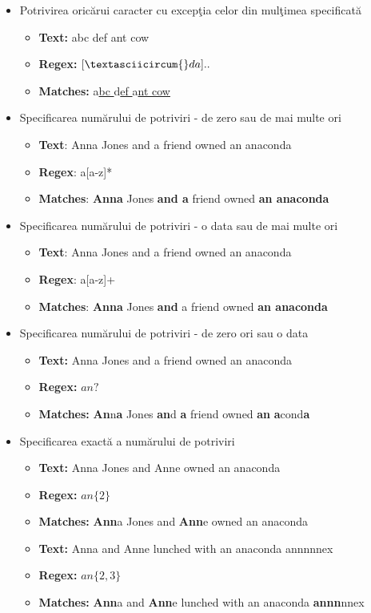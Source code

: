 \begin{itemize}
\item {Potrivirea oricărui caracter cu excepţia celor din mulţimea specificată}
	\begin{itemize}
	\item \textbf{Text:} \space abc def ant cow
	\item \textbf{Regex:} \space $[\textasciicircum{} da]..$
	\item \textbf{Matches:} \space a\underline{bc } d\underline{ef } a\underline{nt cow}
	\end{itemize}

\item {Specificarea numărului de potriviri - de zero sau de mai multe ori}
	\begin{itemize}
	\item
	\textbf{Text}: Anna Jones and a friend owned an anaconda
	\item
	\textbf{Regex}: a[a-z]*
	\item
	\textbf{Matches}: \textbf{Anna} Jones \textbf{and a} friend owned \textbf{an anaconda}
	\end{itemize}

\item {Specificarea numărului de potriviri - o data sau de mai multe ori}
\begin{itemize}
\item
\textbf{Text}: Anna Jones and a friend owned an anaconda
\item
\textbf{Regex}: a[a-z]+
\item
\textbf{Matches}: \textbf{Anna} Jones \textbf{and} a friend owned \textbf{an anaconda}
\end{itemize}

\item {Specificarea numărului de potriviri - de zero ori sau o data}
\begin{itemize}
\item
\textbf{Text:} Anna Jones and a friend owned an anaconda
\item
\textbf{Regex:} $an?$
\item
\textbf{Matches:} \textbf{An}n\textbf{a} Jones \textbf{an}d \textbf{a} friend owned \textbf{an} \textbf{a}cond\textbf{a}
\end{itemize}

\item {Specificarea exactă a numărului de potriviri}
\begin{itemize}
\item
\textbf{Text:} Anna Jones and Anne owned an anaconda
\item
\textbf{Regex:} $an\{2\}$
\item
\textbf{Matches:} \textbf{Ann}a Jones and \textbf{Ann}e owned an anaconda
\newline
\item
\textbf{Text:} Anna and Anne lunched with an anaconda annnnnex
\item
\textbf{Regex:}  $an\{2,3\}$
\item
\textbf{Matches:} \textbf{Ann}a and \textbf{Ann}e lunched with an anaconda \textbf{annn}nnex
\end{itemize}


\end{itemize}
